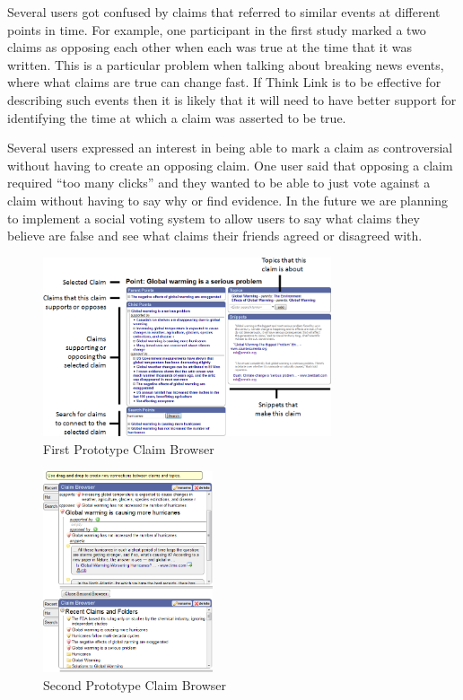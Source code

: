 \documentclass{chi2009}
\begin{document}
Several users got confused by claims that referred to similar events at different points in time. For example, one participant in the first study marked a two claims as opposing each other when each was true at the time that it was written. This is a particular problem when talking about breaking news events, where what claims are true can change fast. If Think Link is to be effective for describing such events then it is likely that it will need to have better support for identifying the time at which a claim was asserted to be true.

Several users expressed an interest in being able to mark a claim as controversial without having to create an opposing claim. One user said that opposing a claim required ``too many clicks'' and they wanted to be able to just vote against a claim without having to say why or find evidence. In the future we are planning to implement a social voting system to allow users to say what claims they believe are false and see what claims their friends agreed or disagreed with.

\begin{figure}[tb]
	\includegraphics[width=8.5cm]{../screenshots/oldpoint_diagram.png}
	\caption{First Prototype Claim Browser}
	\label{oldbrowser}
\end{figure}

\begin{figure}[tb]
\begin{center}
	\includegraphics[width=5cm]{../screenshots/claimbrowse.png}
	\caption{Second Prototype Claim Browser}
	\label{secondbrowser}
\end{center}
\end{figure}
\end{document}
